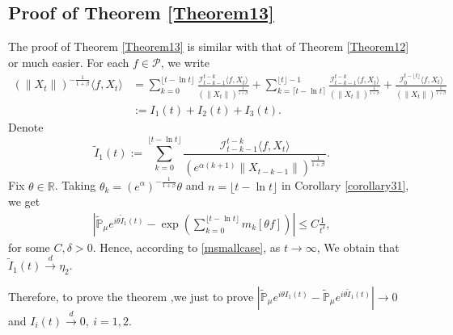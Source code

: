 \documentclass[12pt,oneside,english]{amsart}
\theoremstyle{plain}
\theoremstyle{definition}
\numberwithin{equation}{section}
\begin{document}
\subsection{Proof of Theorem \ref{Theorem13}}
The proof of Theorem \ref{Theorem13} is similar with that of Theorem \ref{Theorem12} or much easier.
     For each $f\in \mathcal{P}$, we write
    \begin{align*}
        (\|X_t\|)^{-\frac{1}{1+\beta}}\langle f,X_t\rangle&=\sum_{k=0}^{\lfloor t-\ln t \rfloor} \frac{\mathcal I_{t-k-1}^{t-k}\langle f ,X_t\rangle}{(\|X_t\|)^{\frac{1}{1+\beta}}}+\sum_{k=\lceil t-\ln t \rceil}^{\lfloor t \rfloor-1} \frac{\mathcal I_{t-k-1}^{t-k}\langle f ,X_t\rangle}{(\|X_t\|)^{\frac{1}{1+\beta}}}+\frac{\mathcal I_0^{t-\lfloor t \rfloor}\langle f ,X_t\rangle}{(\|X_t\|)^{\frac{1}{1+\beta}}}\\
        &:=I_1(t)+I_2(t)+I_3(t).
    \end{align*}
 Denote
    $$\tilde{I}_1(t):=\sum_{k=0}^{\lfloor t-\ln t \rfloor}\frac{\mathcal I_{t-k-1}^{t-k}\langle f ,X_t\rangle}{( e^{\alpha(k+1)}\|X_{t-k-1}\|)^{\frac{1}{1+\beta}}}.$$
    Fix $\theta\in \mathbb{R}$. Taking $\theta_k=(e^{\alpha})^{-\frac{1}{1+\beta}} \theta $ and $n={\lfloor t-\ln t \rfloor}$ in Corollary \ref{corollary31}, we get
    \begin{align*}
        \left|\mathbb{\tilde{P}}_{\mu}e^{i\theta\tilde{I}_1(t)}-\exp\left(\sum_{k=0}^{\lfloor t-\ln t \rfloor}m_k[\theta f]\right)\right|\leq C \frac{1}{t^{\delta}},
    \end{align*}
    for some $C,\delta>0$. Hence, according to \eqref{msmallcase}, as $t\rightarrow \infty$, We obtain that $\tilde{I}_1(t)\xrightarrow{d}\eta_2$.

    Therefore, to prove the theorem ,we just to prove $\left|\mathbb{\tilde{P}}_{\mu}e^{i\theta I_1(t)}-\mathbb{\tilde{P}}_{\mu}e^{i\theta\tilde{I}_1(t)}\right|\rightarrow 0$ and $I_i(t)\xrightarrow{d} 0,~i=1,2$.
\end{document}
